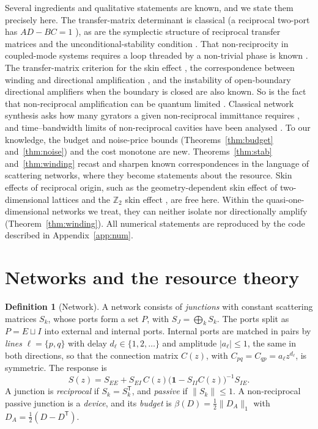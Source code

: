 \documentclass[aps,pra,twocolumn,superscriptaddress,floatfix,nofootinbib]{revtex4-2}
\theoremstyle{definition}
\newtheorem{definition}{Definition}
\newcommand{\one}{\mathbf 1}
\newcommand{\T}{\mathsf T}
\begin{document}
Several ingredients and qualitative statements are known, and we state them precisely here. The transfer-matrix determinant is classical (a reciprocal two-port has $AD-BC=1$ \cite{Poz12}), as are the symplectic structure of reciprocal transfer matrices and the unconditional-stability condition \cite{Rol62}. That non-reciprocity in coupled-mode systems requires a loop threaded by a non-trivial phase is known \cite{RA15,MC15}. The transfer-matrix criterion for the skin effect \cite{KD19}, the correspondence between winding and directional amplification \cite{Por19,WBN20,WBN21,BWN23}, and the instability of open-boundary directional amplifiers when the boundary is closed \cite{WBN20,Xue21} are also known. So is the fact that non-reciprocal amplification can be quantum limited \cite{Kam11,MC15,Mal18}. Classical network synthesis asks how many gyrators a given non-reciprocal immittance requires \cite{AV73}, and time--bandwidth limits of non-reciprocal cavities have been analysed \cite{MSA19}. To our knowledge, the budget and noise-price bounds (Theorems~\ref{thm:budget} and~\ref{thm:noise}) and the cost monotone are new. Theorems~\ref{thm:stab} and~\ref{thm:winding} recast and sharpen known correspondences in the language of scattering networks, where they become statements about the resource. Skin effects of reciprocal origin, such as the geometry-dependent skin effect of two-dimensional lattices \cite{ZYF22,Wan23} and the $\mathbb Z_2$ skin effect \cite{OKSS20,KSUS19}, are free here. Within the quasi-one-dimensional networks we treat, they can neither isolate nor directionally amplify (Theorem~\ref{thm:winding}). All numerical statements are reproduced by the code described in Appendix~\ref{app:num}.

\section{Networks and the resource theory}\label{sec:setting}

\begin{definition}[Network]\label{def:net}
A network consists of \emph{junctions} with constant scattering matrices $S_k$, whose ports form a set $P$, with $S_J=\bigoplus_kS_k$. The ports split as $P=E\sqcup I$ into external and internal ports. Internal ports are matched in pairs by \emph{lines} $\ell=\{p,q\}$ with delay $d_\ell\in\{1,2,\dots\}$ and amplitude $|a_\ell|\le1$, the same in both directions, so that the connection matrix $C(z)$, with $C_{pq}=C_{qp}=a_\ell z^{d_\ell}$, is symmetric. The response is
\begin{equation}
S(z)=S_{EE}+S_{EI}\,C(z)\bigl(\one-S_{II}C(z)\bigr)^{-1}S_{IE}.
\label{eq:response}
\end{equation}
A junction is \emph{reciprocal} if $S_k=S_k^\T$, and \emph{passive} if $\|S_k\|\le1$. A non-reciprocal passive junction is a \emph{device}, and its \emph{budget} is $\beta(D)=\tfrac12\|D_A\|_1$ with $D_A=\tfrac12(D-D^\T)$.
\end{definition}
\end{document}

